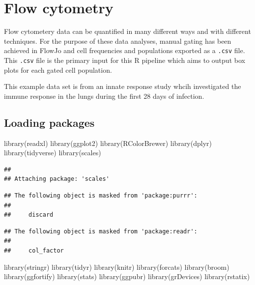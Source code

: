\documentclass[
]{book}
\newenvironment{Shaded}{\begin{snugshade}}{\end{snugshade}}
\newcommand{\FunctionTok}[1]{\textcolor[rgb]{0.00,0.00,0.00}{#1}}
\newcommand{\NormalTok}[1]{#1}
\begin{document}
\hypertarget{flow-cytometry}{%
\chapter{Flow cytometry}\label{flow-cytometry}}

Flow cytometery data can be quantified in many different ways and with different techniques. For the purpose of these data analyses, manual gating has been achieved in FlowJo and cell frequencies and populations exported as a \texttt{.csv} file. This \texttt{.csv} file is the primary input for this R pipeline which aims to output box plots for each gated cell population.

This example data set is from an innate response study whcih investigated the immune response in the lungs during the first 28 days of infection.

\hypertarget{loading-packages}{%
\section{Loading packages}\label{loading-packages}}

\begin{Shaded}
\begin{Highlighting}[]
\FunctionTok{library}\NormalTok{(readxl)}
\FunctionTok{library}\NormalTok{(ggplot2)}
\FunctionTok{library}\NormalTok{(RColorBrewer)}
\FunctionTok{library}\NormalTok{(dplyr)}
\FunctionTok{library}\NormalTok{(tidyverse)}
\FunctionTok{library}\NormalTok{(scales)}
\end{Highlighting}
\end{Shaded}

\begin{verbatim}
## 
## Attaching package: 'scales'
\end{verbatim}

\begin{verbatim}
## The following object is masked from 'package:purrr':
## 
##     discard
\end{verbatim}

\begin{verbatim}
## The following object is masked from 'package:readr':
## 
##     col_factor
\end{verbatim}

\begin{Shaded}
\begin{Highlighting}[]
\FunctionTok{library}\NormalTok{(stringr)}
\FunctionTok{library}\NormalTok{(tidyr)}
\FunctionTok{library}\NormalTok{(knitr)}
\FunctionTok{library}\NormalTok{(forcats)}
\FunctionTok{library}\NormalTok{(broom)}
\FunctionTok{library}\NormalTok{(ggfortify)}
\FunctionTok{library}\NormalTok{(stats)}
\FunctionTok{library}\NormalTok{(ggpubr)}
\FunctionTok{library}\NormalTok{(grDevices)}
\FunctionTok{library}\NormalTok{(rstatix)}
\end{Highlighting}
\end{Shaded}
\end{document}
